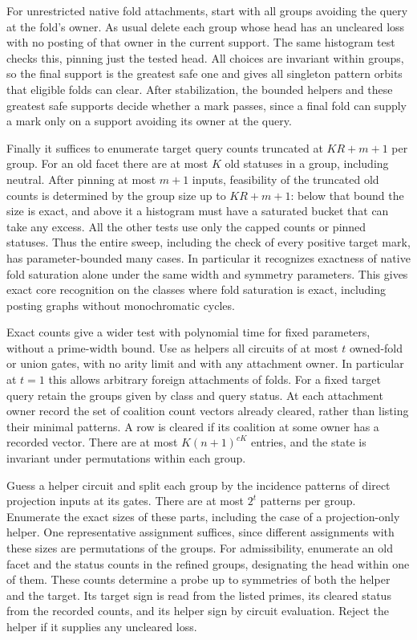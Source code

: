 For unrestricted native fold attachments, start with all
groups avoiding the query at the fold's owner. As usual delete each group
whose head has an uncleared loss with no posting of that
owner in the current support. The same histogram test checks
this, pinning just the tested head. All choices are invariant
within groups, so the final support is the greatest safe one
and gives all singleton pattern orbits that eligible folds
can clear. After stabilization, the bounded helpers and these
greatest safe supports decide whether a mark passes, since a
final fold can supply a mark only on a support avoiding its
owner at the query.

Finally it suffices to enumerate target query counts truncated
at $KR+m+1$ per group. For an old facet there are at most $K$
old statuses in a group, including neutral. After pinning
at most $m+1$ inputs, feasibility of the truncated old counts
is determined by the group size up to $KR+m+1$: below that
bound the size is exact, and above it a histogram must have
a saturated bucket that can take any excess. All the other
tests use only the capped counts or pinned statuses. Thus the
entire sweep, including the check of every positive target
mark, has parameter-bounded many cases. In particular it
recognizes exactness of native fold saturation alone under the same
width and symmetry parameters. This gives exact core
recognition on the classes where fold saturation is exact,
including posting graphs without monochromatic cycles.

Exact counts give a wider test with polynomial time for fixed
parameters, without a prime-width bound. Use as helpers all
circuits of at most $t$ owned-fold or union gates, with no
arity limit and with any attachment owner. In particular at
$t=1$ this allows arbitrary foreign attachments of folds.
For a fixed target query retain the groups given by class and
query status. At each attachment owner record the set of
coalition count vectors already cleared, rather than listing
their minimal patterns. A row is cleared if its coalition
at some owner has a recorded vector. There are at most
$K(n+1)^{cK}$ entries, and the state is invariant under
permutations within each group.

Guess a helper circuit and split each group by the incidence
patterns of direct projection inputs at its gates. There are
at most $2^t$ patterns per group. Enumerate the exact sizes of
these parts, including the case of a projection-only helper.
One representative assignment suffices, since different
assignments with these sizes are permutations of the groups.
For admissibility, enumerate an old facet and the status
counts in the refined groups, designating the head within
one of them. These counts determine a probe up to symmetries
of both the helper and the target. Its target sign is read
from the listed primes, its cleared status from the recorded
counts, and its helper sign by circuit evaluation. Reject
the helper if it supplies any uncleared loss.

